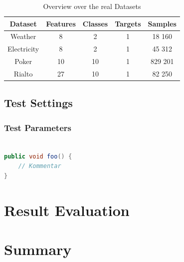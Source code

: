 \documentclass[12pt,oneside,a4paper,parskip]{scrbook}
\begin{document}
\begin{table}[H]
  \label{tab:realdata}
  \centering
  \begin{tabular} {|| c c c c c ||} 
    \hline
      Dataset & Features & Classes & Targets & Samples \\
    \hline\hline
      Weather & 8 & 2 & 1 & 18 160 \\
    \hline 
      Electricity & 8 & 2 & 1 & 45 312 \\
    \hline
      Poker & 10 & 10 & 1 & 829 201 \\
    \hline
      Rialto & 27 & 10 & 1 & 82 250 \\
    \hline
  \end{tabular} 
  \caption{Overview over the real Datasets}
\end{table}

\section{Test Settings}

\subsection{Test Parameters}

\begin{lstlisting}[label=lst:java,
				   language=java,
				   firstnumber=1,
				   caption=Beispiel für einen Quelltext]				   

public void foo() {				   
	// Kommentar
}
\end{lstlisting}

\chapter{Result Evaluation}

\chapter{Summary}

\backmatter

\printacronyms[include-classes=abbrev,name=Abbreviations]


\listoffigures
{}			

\listoftables
\end{document}
